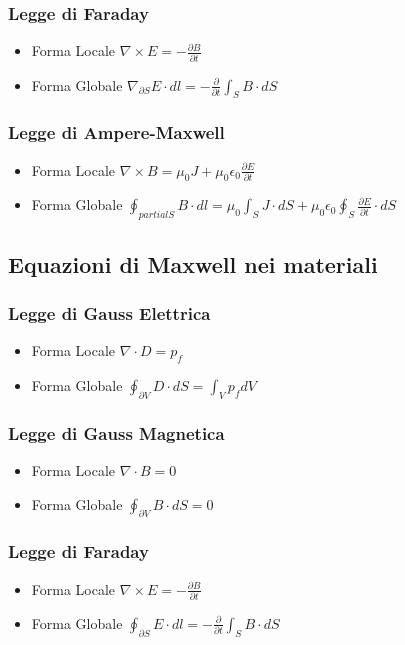 \documentclass[a4paper, 10pt]{article}
\begin{document}
			\subsubsection{Legge di Faraday}
				\begin{itemize}
					\item Forma Locale $\nabla \times E = - \frac{\partial B}{\partial t}$
					\item Forma Globale $\nabla_{\partial S} E \cdot dl = -\frac{\partial}{\partial t} \int_S B \cdot dS$
				\end{itemize}
			\subsubsection{Legge di Ampere-Maxwell}
				\begin{itemize}
					\item Forma Locale $\nabla \times B = \mu_0 J + \mu_0 \epsilon_0 \frac{\partial E}{\partial t}$
					\item Forma Globale $\oint_{partial S} B\cdot dl = \mu_0 \int_S J\cdot dS + \mu_0 
										\epsilon_0 \oint_S \frac{\partial E}{\partial t} \cdot dS $
				\end{itemize}
				
		\subsection{Equazioni di Maxwell nei materiali}
			\subsubsection{Legge di Gauss Elettrica}
				\begin{itemize}
					\item Forma Locale $\nabla \cdot D = p_f$
					\item Forma Globale $\oint_{\partial V} D \cdot dS = \int_V p_f dV$
				\end{itemize}
			\subsubsection{Legge di Gauss Magnetica}
				\begin{itemize}
					\item Forma Locale $\nabla \cdot B= 0$
					\item Forma Globale $\oint_{\partial V} B \cdot dS = 0$
				\end{itemize}
			\subsubsection{Legge di Faraday}
				\begin{itemize}
					\item Forma Locale  $\nabla \times E = -\frac{\partial B}{\partial t}$
					\item Forma Globale $\oint_{\partial S} E \cdot dl = -\frac{\partial}{\partial t} \int_S B \cdot dS$
				\end{itemize}
\end{document}
